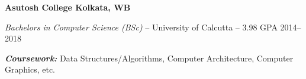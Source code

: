 \textbf{Asutosh College \hfill Kolkata, WB} \par
\textit{Bachelors in Computer Science (BSc)} -- University of Calcutta -- 3.98 GPA \hfill 2014--2018\par
\textbf{\textit{Coursework:}} Data Structures/Algorithms, Computer Architecture, Computer Graphics, etc.\par